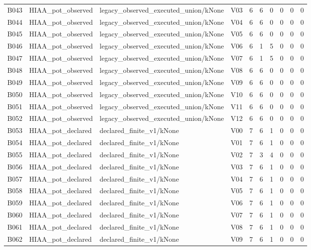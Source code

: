 \begin{longtable}{llllllllll}
B043 & HIAA\_pot\_observed & legacy\_observed\_executed\_union/kNone & V03 & 6 & 6 & 0 & 0 & 0 & 0 \\
B044 & HIAA\_pot\_observed & legacy\_observed\_executed\_union/kNone & V04 & 6 & 6 & 0 & 0 & 0 & 0 \\
B045 & HIAA\_pot\_observed & legacy\_observed\_executed\_union/kNone & V05 & 6 & 6 & 0 & 0 & 0 & 0 \\
B046 & HIAA\_pot\_observed & legacy\_observed\_executed\_union/kNone & V06 & 6 & 1 & 5 & 0 & 0 & 0 \\
B047 & HIAA\_pot\_observed & legacy\_observed\_executed\_union/kNone & V07 & 6 & 1 & 5 & 0 & 0 & 0 \\
B048 & HIAA\_pot\_observed & legacy\_observed\_executed\_union/kNone & V08 & 6 & 6 & 0 & 0 & 0 & 0 \\
B049 & HIAA\_pot\_observed & legacy\_observed\_executed\_union/kNone & V09 & 6 & 6 & 0 & 0 & 0 & 0 \\
B050 & HIAA\_pot\_observed & legacy\_observed\_executed\_union/kNone & V10 & 6 & 6 & 0 & 0 & 0 & 0 \\
B051 & HIAA\_pot\_observed & legacy\_observed\_executed\_union/kNone & V11 & 6 & 6 & 0 & 0 & 0 & 0 \\
B052 & HIAA\_pot\_observed & legacy\_observed\_executed\_union/kNone & V12 & 6 & 6 & 0 & 0 & 0 & 0 \\
B053 & HIAA\_pot\_declared & declared\_finite\_v1/kNone & V00 & 7 & 6 & 1 & 0 & 0 & 0 \\
B054 & HIAA\_pot\_declared & declared\_finite\_v1/kNone & V01 & 7 & 6 & 1 & 0 & 0 & 0 \\
B055 & HIAA\_pot\_declared & declared\_finite\_v1/kNone & V02 & 7 & 3 & 4 & 0 & 0 & 0 \\
B056 & HIAA\_pot\_declared & declared\_finite\_v1/kNone & V03 & 7 & 6 & 1 & 0 & 0 & 0 \\
B057 & HIAA\_pot\_declared & declared\_finite\_v1/kNone & V04 & 7 & 6 & 1 & 0 & 0 & 0 \\
B058 & HIAA\_pot\_declared & declared\_finite\_v1/kNone & V05 & 7 & 6 & 1 & 0 & 0 & 0 \\
B059 & HIAA\_pot\_declared & declared\_finite\_v1/kNone & V06 & 7 & 6 & 1 & 0 & 0 & 0 \\
B060 & HIAA\_pot\_declared & declared\_finite\_v1/kNone & V07 & 7 & 6 & 1 & 0 & 0 & 0 \\
B061 & HIAA\_pot\_declared & declared\_finite\_v1/kNone & V08 & 7 & 6 & 1 & 0 & 0 & 0 \\
B062 & HIAA\_pot\_declared & declared\_finite\_v1/kNone & V09 & 7 & 6 & 1 & 0 & 0 & 0 \\

\end{longtable}
